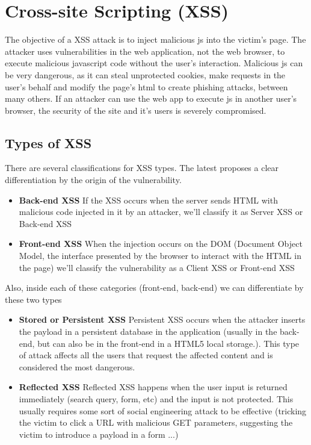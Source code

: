 \section{Cross-site Scripting (XSS)}
The objective of a XSS attack is to inject malicious js into the victim's page. The attacker uses vulnerabilities in the web application, not the web browser, to execute malicious javascript code without the user's interaction. Malicious js can be very dangerous, as it can steal unprotected cookies, make requests in the user's behalf and modify the page's html to create phishing attacks, between many others. If an attacker can use the web app to execute js in another user's browser, the security of the site and it's users is severely compromised.

\subsection{Types of XSS}
There are several classifications for XSS types. The latest proposes a clear differentiation by the origin of the vulnerability.

\begin{itemize}
  \item \textbf{Back-end XSS} If the XSS occurs when the server sends HTML with malicious code injected in it by an attacker, we'll classify it as Server XSS or Back-end XSS
  \item \textbf{Front-end XSS} When the injection occurs on the DOM (Document Object Model, the interface presented by the browser to interact with the HTML in the page) we'll classify the vulnerability as a Client XSS or Front-end XSS
\end{itemize}

Also, inside each of these categories (front-end, back-end) we can differentiate by these two types

\begin{itemize}
  \item \textbf{Stored or Persistent XSS} Persistent XSS occurs when the attacker inserts the payload in a persistent database in the application (usually in the back-end, but can also be in the front-end in a HTML5 local storage.). This type of attack affects all the users that request the affected content and is considered the most dangerous.
  
  \item \textbf{Reflected XSS} Reflected XSS happens when the user input is returned immediately (search query, form, etc) and the input is not protected. This usually requires some sort of social engineering attack to be effective (tricking the victim to click a URL with malicious GET parameters, suggesting the victim to introduce a payload in a form ...)
\end{itemize}

